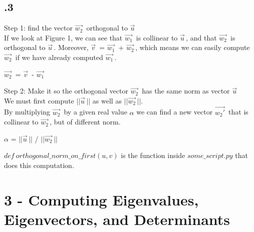\documentclass[a4paper]{article}
\begin{document}
\subsection*{.3}
Step 1: find the vector $\vec{w_{2}}^{\,}$ orthogonal to $\vec{u}^{\,}$\\
If we look at Figure 1, we can see that $\vec{w_{1}}^{\,}$ is collinear to $\vec{u}^{\,}$, and that $\vec{w_{2}}^{\,}$ is orthogonal to $\vec{u}^{\,}$. Moreover, $\vec{v}^{\,}$ = $\vec{w_{1}}^{\,}$ + $\vec{w_{2}}^{\,}$, which means we can easily compute $\vec{w_{2}}^{\,}$ if we have already computed $\vec{w_{1}}^{\,}$. 
\begin{center}
$\vec{w_{2}}^{\,}$ = $\vec{v}^{\,}$ - $\vec{w_{1}}^{\,}$
\end{center}
Step 2: Make it so the orthogonal vector $\vec{w_{2}}^{\,}$ has the same norm as vector $\vec{u}^{\,}$\\
We must first compute $||\vec{u}^{\,}||$ as well as $||\vec{w_{2}}^{\,}||$.\\
By multiplying $\vec{w_{2}}^{\,}$ by a given real value $\alpha$ we can find a new vector $\vec{w_{2}'}^{\,}$ that is collinear to $\vec{w_{2}}^{\,}$, but of different norm.
\begin{center}
$\alpha$ = $||\vec{u}^{\,}||$ / $||\vec{w_{2}}^{\,}||$
\end{center}
\textbf{$def\ orthogonal\_norm\_on\_first(u, v)$} is the function inside $some\_script.py$ that does this computation.

\section*{3 - Computing Eigenvalues, Eigenvectors, and Determinants}
\end{document}
